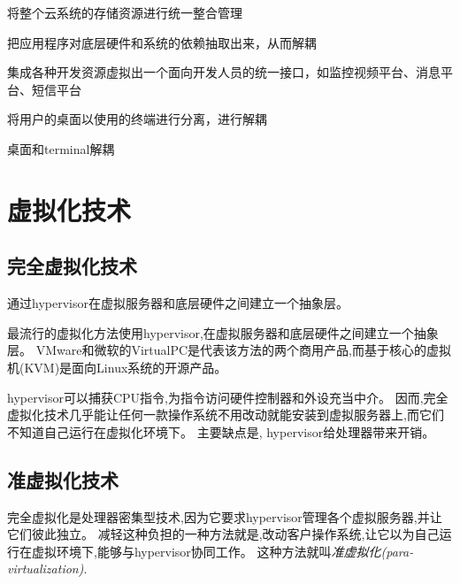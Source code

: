 \begin{definition}[存储虚拟化]
    将整个云系统的存储资源进行统一整合管理
\end{definition}

\begin{definition}[应用程序虚拟化]
    把应用程序对底层硬件和系统的依赖抽取出来，从而解耦
\end{definition}

\begin{definition}[平台虚拟化]
    集成各种开发资源虚拟出一个面向开发人员的统一接口，如监控视频平台、消息平台、短信平台
\end{definition}

\begin{definition}[桌面虚拟化]
    将用户的桌面以使用的终端进行分离，进行解耦

    桌面和terminal解耦
\end{definition}

\section{虚拟化技术}


\subsection{完全虚拟化技术}

\begin{definition}[完全虚拟化技术]
    通过hypervisor在虚拟服务器和底层硬件之间建立一个抽象层。 
\end{definition}

最流行的虚拟化方法使用hypervisor,在虚拟服务器和底层硬件之间建立一个抽象层。 VMware和微软的VirtualPC是代表该方法的两个商用产品,而基于核心的虚拟机(KVM)是面向Linux系统的开源产品。 

hypervisor可以捕获CPU指令,为指令访问硬件控制器和外设充当中介。 因而,完全虚拟化技术几乎能让任何一款操作系统不用改动就能安装到虚拟服务器上,而它们不知道自己运行在虚拟化环境下。 主要缺点是, hypervisor给处理器带来开销。 


\subsection{准虚拟化技术}

\begin{definition}[准虚拟化技术]
    完全虚拟化是处理器密集型技术,因为它要求hypervisor管理各个虚拟服务器,并让它们彼此独立。 减轻这种负担的一种方法就是,改动客户操作系统,让它以为自己运行在虚拟环境下,能够与hypervisor协同工作。 这种方法就叫\textit{准虚拟化(para-virtualization)}. 
\end{definition}

